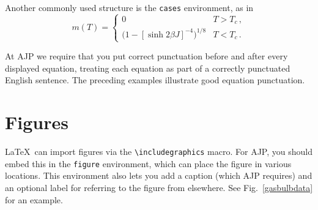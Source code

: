 \documentclass[prb,preprint]{revtex4-1}
\begin{document}
Another commonly used structure is the \texttt{cases} environment, as in
\begin{equation}
m(T) =
\begin{cases}
	0 & T > T_c \, , \\
	\bigl(1 - [\sinh 2 \beta J]^{-4} \bigr)^{1/8} & T < T_c \, .
\end{cases}
\end{equation}

At AJP we require that you put correct punctuation before and after every
displayed equation, treating each equation as part of a correctly punctuated
English sentence.\cite{mermin} The preceding examples illustrate good
equation punctuation.


\section{Figures}

\LaTeX\ can import figures via the \verb/\includegraphics/ macro.
For AJP, you should embed this in the \texttt{figure} environment, which 
can place the figure in various locations.  This environment also lets 
you add a caption (which AJP requires) and an optional label for referring 
to the figure from elsewhere.  See Fig.~\ref{gasbulbdata} for an example.
\end{document}
